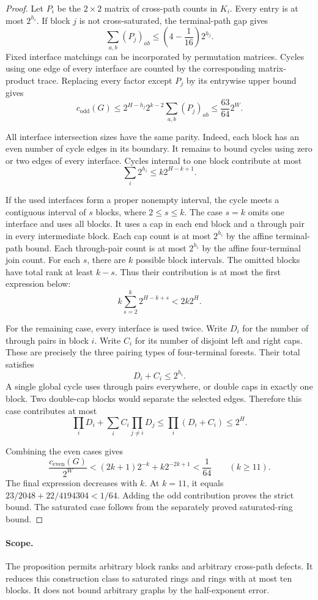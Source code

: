 \begin{proof}
Let $P_i$ be the $2\times2$ matrix of cross-path counts in $K_i$.
Every entry is at most $2^{h_i}$.
If block $j$ is not cross-saturated, the terminal-path gap gives
\[
 \sum_{a,b}(P_j)_{ab}\le \left(4-\frac1{16}\right)2^{h_j}.
\]
Fixed interface matchings can be incorporated by permutation matrices.
Cycles using one edge of every interface are counted by the corresponding
matrix-product trace.
Replacing every factor except $P_j$ by its entrywise upper bound gives
\[
 c_{\mathrm{odd}}(G)
 \le 2^{H-h_j}2^{k-2}\sum_{a,b}(P_j)_{ab}
 \le \frac{63}{64}2^W.
\]

All interface intersection sizes have the same parity.
Indeed, each block has an even number of cycle edges in its boundary.
It remains to bound cycles using zero or two edges of every interface.
Cycles internal to one block contribute at most
\[
 \sum_i 2^{h_i}\le k2^{H-k+1}.
\]

If the used interfaces form a proper nonempty interval, the cycle meets a
contiguous interval of $s$ blocks, where $2\le s\le k$.
The case $s=k$ omits one interface and uses all blocks.
It uses a cap in each end block and a through pair in every intermediate block.
Each cap count is at most $2^{h_i}$ by the affine terminal-path bound.
Each through-pair count is at most $2^{h_i}$ by the affine four-terminal
join count. For each $s$, there are $k$ possible block intervals.
The omitted blocks have total rank at least $k-s$.
Thus their contribution is at most the first expression below:
\[
 k\sum_{s=2}^{k}2^{H-k+s}<2k2^H.
\]

For the remaining case, every interface is used twice.
Write $D_i$ for the number of through pairs in block $i$.
Write $C_i$ for its number of disjoint left and right caps.
These are precisely the three pairing types of four-terminal forests.
Their total satisfies
\[
 D_i+C_i\le2^{h_i}.
\]
A single global cycle uses through pairs everywhere, or double caps in
exactly one block. Two double-cap blocks would separate the selected edges.
Therefore this case contributes at most
\[
 \prod_iD_i+\sum_i C_i\prod_{j\ne i}D_j
 \le\prod_i(D_i+C_i)\le2^H.
\]

Combining the even cases gives
\[
 \frac{c_{\mathrm{even}}(G)}{2^W}
 <(2k+1)2^{-k}+k2^{-2k+1}<\frac1{64}
 \qquad(k\ge11).
\]
The final expression decreases with $k$.
At $k=11$, it equals $23/2048+22/4194304<1/64$.
Adding the odd contribution proves the strict bound.
The saturated case follows from the separately proved saturated-ring bound.
\end{proof}

\paragraph{Scope.}
The proposition permits arbitrary block ranks and arbitrary cross-path defects.
It reduces this construction class to saturated rings and rings with at most
ten blocks. It does not bound arbitrary graphs by the half-exponent error.
